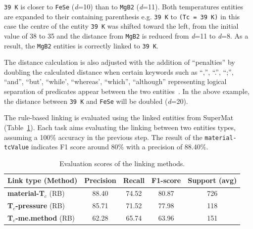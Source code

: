 \documentclass{article}
\newcommand{\tc}{T$_{c}$}
\begin{document}
\texttt{39 K} is closer to \texttt{FeSe} (\textit{d}=10) than to \texttt{MgB2} (\textit{d}=11).
Both temperatures entities are expanded to their containing parenthesis e.g. \texttt{39 K} to \texttt{(Tc = 39 K)} in this case the centre of the entity \texttt{39 K} was shifted toward the left, from the initial value of 38 to 35 and the distance from \texttt{MgB2} is reduced from \textit{d}=11 to \textit{d}=8. 
As a result, the \texttt{MgB2} entities is correctly linked to \texttt{39 K}. 

The distance calculation is also adjusted with the addition of ``penalties'' by doubling the calculated distance when certain keywords such as ``,'', ``.'', ``;'', ``and'', ``but', ``while', ``whereas', ``which'', ``although'' representing logical separation of predicates appear between the two entities~\cite{oka2021table}. 
In the above example, the distance between \texttt{39 K} and \texttt{FeSe} will be doubled (\textit{d}=20).

The rule-based linking is evaluated using the linked entities from SuperMat~\cite{foppiano2021supermat} (Table~\ref{table:evaluation-linking}). 
Each task aims evaluating the linking between two entities types, assuming a 100\% accuracy in the previous step. 
The result of the \texttt{material-tcValue} indicates F1 score around 80\% with a precision of 88.40\%.

\begin{table}[ht]
\centering\small
\begin{tabular}{lcccc}
\toprule 
\textbf{Link type} (Method) & \textbf{Precision} & \textbf{Recall} & \textbf{F1-score} & Support (avg) \\ 
\midrule
\textbf{material-\tc} (RB)      &  88.40    & 74.52 &    80.87 &   726  \\
\textbf{\tc-pressure} (RB)      & 85.71  &  71.52  &  77.98  &  118     \\
\textbf{\tc-me.method} (RB)     & 62.28 & 65.74 &  63.96  &  151 \\
\bottomrule
\end{tabular}
\caption{\label{table:evaluation-linking} Evaluation scores of the linking methods. }
\end{table}
\end{document}
